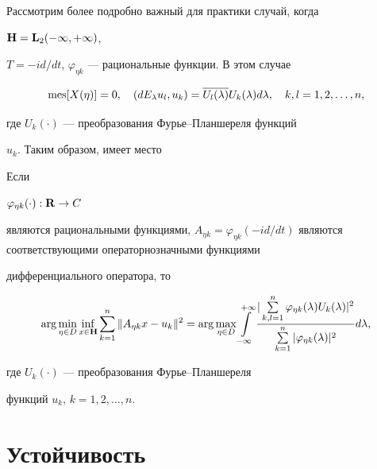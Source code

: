 Рассмотрим более подробно важный для практики случай, когда


${\bold H}={\bold L}_2( -\infty,+\infty ) $, \linebreak


$T=-id/dt$, $\varphi_{\eta k}$ --- рациональные функции. В этом случае


$$


\mes [ X( \eta ) ] =0, \quad ( dE_\lambda


u_l,u_k) =\overline{U_l( \lambda ) }U_k( \lambda


) d\lambda, \quad k,l=1,2,\dotsc,n, 


$$


где $U_k( \cdot ) $ --- преобразования Фурье--Планшереля функций


$u_k$. Таким образом, имеет место





\begin{thm}


\label{th2} Если


$\varphi_{\eta k}( \cdot ) : {\bold R\to C} $


являются рациональными функциями, $ A_{\eta k}=\varphi_{\eta k}( -i


d/dt) $ являются соответствующими операторнозначными функциями


дифференциального оператора, то


$$


\arg \min_{\eta \in D}\inf_{x\in {\bold H }}\sum_{k=1}^n\| A_{\eta


k}x-u_k\|^2=\arg \max_{\eta \in D}\int\limits_{-\infty }^{+\infty }\frac{


| \sum\limits_{k,l=1}^n\varphi_{\eta k}( \lambda )


U_k( \lambda ) |^2}{\sum\limits_{k=1}^n| \varphi


_{\eta k}( \lambda ) |^2}d\lambda, 


$$


где $U_k( \cdot ) $ --- преобразования Фурье--Планшереля


функций $u_k$, $k=1,2,\dotsc,n$.


\end{thm}





\section*{Устойчивость}





